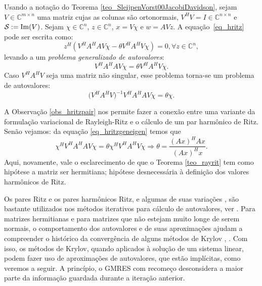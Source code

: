\begin{obs}\label{obs_hritzpair}
Usando a notação do Teorema \ref{teo_SleijpenVorst00JacobiDavidson}, sejam  $V\in \mathbb{C}^{m\times n}$ uma matriz cujas as colunas são ortonormais, $V^HV=I\in \mathbb{C}^{n\times n}$ e
 $\mathcal{S}:=\operatorname{Im}(V)$.
Sejam $\chi\in \mathbb{C}^{n}$, $z\in \mathbb{C}^{n}$, $x = V\chi$ e $w = AVz$. A equação~\eqref{eq_hritz}
pode ser escrita como:
\begin{equation}\label{eq_ritzharmorepre}
z^H (V^HA^HAV\chi - \theta V^HA^HV \chi) = 0, \forall z\in \mathbb{C}^{n},
\end{equation}
\noindent levando a um  \emph{problema generalizado de autovalores}:
\begin{equation}\label{eq_hritzgeneigen}
V^HA^HAV\chi = \theta V^HA^HV\chi.
\end{equation}
 Caso $V^HA^HV$ seja uma matriz não singular, esse problema torna-se um problema de autovalores:
\begin{equation}\label{eq_hritzeigen}
\bigg(V^HA^HV\bigg)^{-1}V^HA^HAV\chi = \theta \chi.
\end{equation}
\end{obs}
A Observação \ref{obs_hritzpair} nos permite fazer a conexão entre uma variante da formulação variacional de Rayleigh-Ritz e o cálculo de um par harmônico de Ritz. Senão vejamos: da equação \eqref{eq_hritzgeneigen} temos que
\[
\chi^HV^HA^HAV\chi = \theta \chi^HV^HA^HV\chi\Rightarrow \theta=\frac{\displaystyle (Ax)^HAx}{\displaystyle (Ax)^Hx}.
\]
Aqui, novamente, vale o esclarecimento de que o Teorema \ref{teo_rayrit} tem como hip\'{o}tese a matriz ser hermitiana; hip\'{o}tese desnecessária à definição dos valores harmônicos de Ritz.


Os pares Ritz e os pares harmônicos  Ritz, e algumas de suas variaç\~{o}es \cite{Beattie1998Harmonic}, são bastante utilizados nos métodos iterativos para cálculo de autovalores, ver \cite{BaiDemmelEtAl2000Templates}. Para matrizes hermitianas e para matrizes que não estejam muito longe de serem normais, o comportamento dos autovalores e de suas aproximaç\~{o}es ajudam a compreender o hist\'{o}rico da convergência de alguns  métodos de Krylov \cite{Cullum1996Iterative}, \cite{GreenbaumPtakEtAl96Any}. Com isso, os métodos de Krylov,  quando aplicados à solução de um sistema linear, podem fazer uso de aproximaç\~{o}es de autovalores, que estão implícitas, como veremos a seguir. A princípio, o GMRES com recomeço desconsidera  a maior parte da informação guardada durante a iteração anterior.

